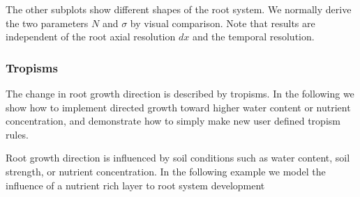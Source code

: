 The other subplots show different shapes of the root system. We normally derive the two parameters $N$ and $\sigma$ by visual comparison. Note that results are independent of the root axial resolution $dx$ and the temporal resolution.
% 



\subsubsection*{Tropisms} \label{sec:tropism}

The change in root growth direction is described by tropisms. In the following we show how to implement directed growth toward higher water content or nutrient concentration, and demonstrate how to simply make new user defined tropism rules. 


Root growth direction is influenced by soil conditions such as water content, soil strength, or nutrient concentration. In the following example we model the influence of a nutrient rich layer to root system development



